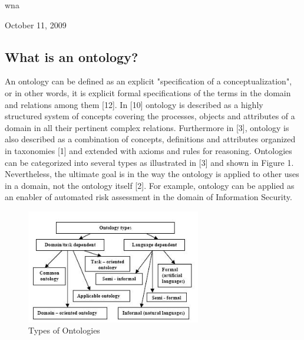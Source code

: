\documentclass[conference, compsoc]{IEEEtran}
\begin{document}


\hfill wna
 
\hfill October 11, 2009

\subsection{What is an ontology?}
An ontology can be defined as an explicit "specification of a conceptualization", or in other words, it is explicit formal specifications of the terms in the domain and relations among them [12]. In [10] ontology is described as a highly structured system of concepts covering the processes, objects and attributes of a domain in all their pertinent complex relations. Furthermore in [3], ontology is also described as a combination of concepts, definitions and attributes organized in taxonomies [1] and extended with axioms and rules for reasoning. Ontologies can be categorized into several types as illustrated in [3] and shown in Figure 1. Nevertheless, the ultimate goal is in the way the ontology is applied to other uses in a domain, not the ontology itself [2]. For example, ontology can be applied as an enabler of automated risk assessment in the domain of Information Security. 

\begin{figure}[!t]
\centering
\includegraphics[width=3.0in]{ont-types}
\caption{Types of Ontologies}
\label{ont-types}
\end{figure}
\end{document}
